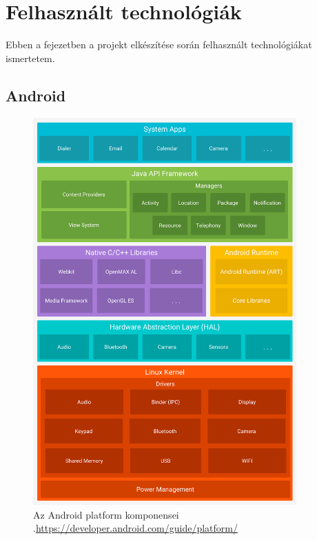 
\chapter{Felhasznált technológiák}

\begin{osszefoglal}
	Ebben a fejezetben a projekt elkészítése során felhasznált technológiákat ismertetem.
	
\end{osszefoglal}

\section{Android}

\begin{figure}
	\centering
	\setlength{\abovecaptionskip}{0pt}
	\setlength{\belowcaptionskip}{0pt}
	\includegraphics[width=0.9\textwidth, scale=0.9]{images/android}
	 \caption[]%
	{Az Android platform komponensei\\
		{\white .}\hfill\url{https://developer.android.com/guide/platform/}}
\end{figure}

